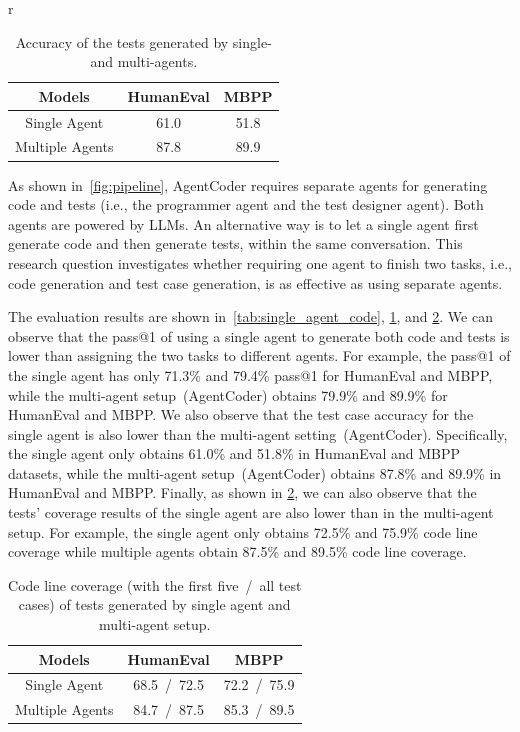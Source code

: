 \documentclass[manuscript,screen,review]{acmart}
\newcommand{\xxx}{AgentCoder\xspace}
\begin{document}
\begin{table}{r}
    \centering
    \caption{Accuracy of the tests generated by single- and multi-agents.}
    \begin{tabular}{c|cc}
    \toprule
    Models&HumanEval&MBPP\\
    \midrule
         Single Agent&61.0&51.8\\
         Multiple Agents&87.8&89.9 \\
         \bottomrule
    \end{tabular}
    \label{tab:single_agent_tests}
\end{table}


As shown in~\cref{fig:pipeline}, \xxx requires separate agents for generating code and tests (i.e., the programmer agent and the test designer agent). 
Both agents are powered by LLMs. 
An alternative way is to let a single agent first generate code and then generate tests, within the same conversation.
This research question investigates 
whether requiring one agent to finish two tasks, i.e., code generation and test case generation, is as effective as using separate agents. 


The evaluation results are shown in~\cref{tab:single_agent_code}, \cref{tab:single_agent_tests}, and \cref{tab:rq6_coverage}. We can observe that the pass@1 of using a single agent to generate both code and tests is lower than assigning the two tasks to different agents. For example, the pass@1 of the single agent has only  71.3\% and 79.4\% pass@1 for HumanEval and MBPP, while the multi-agent setup~(\xxx) obtains 79.9\% and 89.9\% for HumanEval and MBPP. We also observe that the test case accuracy for the single agent is also lower than the multi-agent setting~(\xxx). Specifically, the single agent only obtains 61.0\% and 51.8\% in HumanEval and MBPP datasets, while the multi-agent setup~(\xxx) obtains 87.8\% and 89.9\% in HumanEval and MBPP. 
Finally, as shown in \cref{tab:rq6_coverage}, we can also observe that the tests' coverage results of the single agent are also lower than in the multi-agent setup. For example, the single agent only obtains 72.5\% and 75.9\% code line coverage while multiple agents obtain 87.5\% and 89.5\% code line coverage.



\begin{table}
    \centering
    \caption{Code line coverage (with the first five~/~all test cases) of tests generated by single agent and multi-agent setup. }
    \begin{tabular}{c|cc}
    \toprule
    Models&HumanEval&MBPP\\
    \midrule
        Single Agent&68.5~/~72.5&72.2~/~75.9\\
         Multiple Agents&84.7~/~87.5&85.3~/~89.5\\
         \bottomrule
    \end{tabular}
    \label{tab:rq6_coverage}
\end{table}
\end{document}
